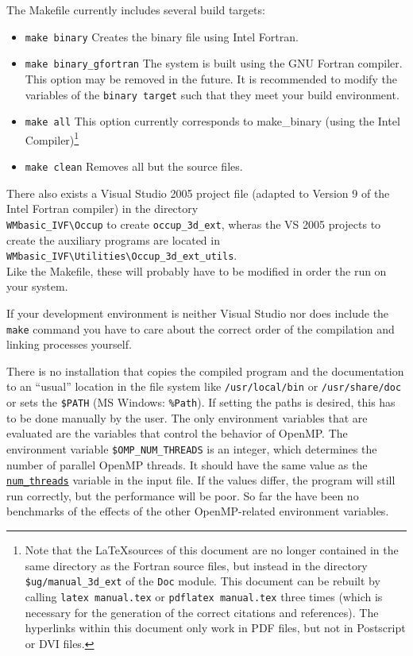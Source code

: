 \documentclass[a4paper,10pt]{article}
\begin{document}
The Makefile currently includes several build targets:
\begin{itemize}
\item \texttt{make binary} Creates the binary file using Intel Fortran.
\item \texttt{make binary\_gfortran} The system is built  using the GNU Fortran 
compiler. This option may be removed in the future. It is recommended to modify 
the variables of the \texttt{binary target} such that they meet your build 
environment.\item \texttt{make all} This option currently corresponds to 
make\_binary (using the Intel Compiler)\footnote{Note that the \LaTeX sources of 
this document are no longer contained in the same directory as
the Fortran source files, but instead in the directory 
\texttt{\$ug/manual\_3d\_ext} of the \texttt{Doc} module. This document can
be rebuilt by calling
\texttt{latex manual.tex}
or 
\texttt{pdflatex manual.tex}
three times (which is necessary for the generation of the correct citations and 
references). The hyperlinks within this document only work in PDF files, but not 
in Postscript or DVI files.} \item \texttt{make clean} Removes all but the 
source files.
\end{itemize}

There also exists a Visual Studio 2005 project file (adapted to Version 9 of  
the Intel Fortran compiler) in the directory\\
\texttt{WMbasic\_IVF\textbackslash Occup}
to create \texttt{occup\_3d\_ext},
 wheras the VS 2005 projects to create the auxiliary programs are
located in\\
\texttt{WMbasic\_IVF\textbackslash Utilities\textbackslash Occup\_3d\_ext\_utils}.\\
Like the Makefile, these will probably have to be modified in order the run on 	
your system.

If your development environment is neither Visual Studio nor does  include the 
\texttt{make} command  you have to 
care about the correct order of the compilation and linking processes yourself.

There is no installation that copies the compiled program and the documentation  
to an ``usual'' location in the file system like \texttt{/usr/local/bin} or 
\texttt{/usr/share/doc} or sets the \texttt{\$PATH} (MS Windows: 
\texttt{\%Path}). If setting the paths is desired, this has to be done manually 
by the user. The only environment variables  that are evaluated are the 
variables that control the behavior of OpenMP. The environment variable 
\texttt{\$OMP\_NUM\_THREADS} is an integer, which determines the number of 
parallel OpenMP threads. It should have the same value as the 
\texttt{\hyperref[opt:numthreads]{num\_threads}} variable in the input file. 
If the values differ, the program will still run correctly, but the performance 
will be poor. So far the have been no benchmarks of the effects of the other 
OpenMP-related environment variables.   
\end{document}
